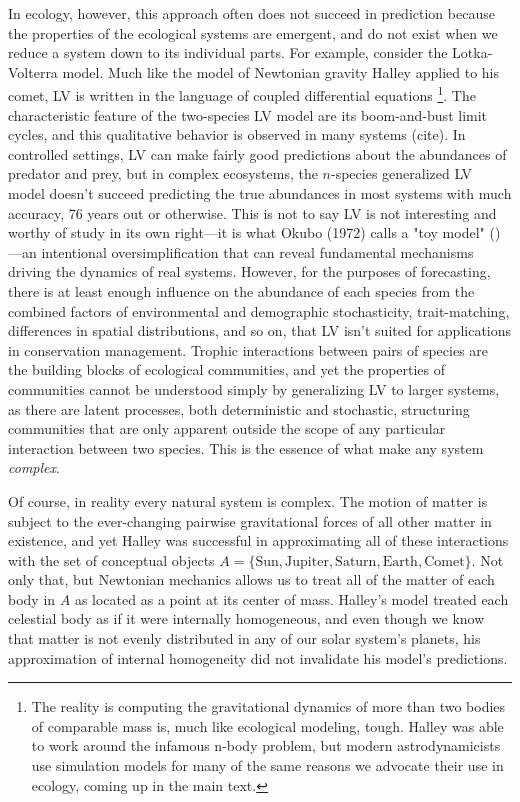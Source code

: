 \documentclass[]{article}
\begin{document}
In ecology, however, this approach often does not succeed in prediction because the properties of the ecological systems are emergent, and do
not exist when we reduce a system down to its individual parts.
For example, consider the Lotka-Volterra model.
Much like the model of Newtonian gravity Halley applied to his comet, LV is written in the
language of coupled differential equations
\footnote{The reality is computing the gravitational dynamics of more than two bodies of comparable mass is, much like ecological modeling, tough. Halley was able to work around the infamous n-body problem, but modern astrodynamicists use simulation models for many of the same reasons we advocate their use in ecology, coming up in the main text.}.\renewcommand*{\arraystretch}{1.4}
The characteristic feature of the two-species LV model are its boom-and-bust limit cycles, and this qualitative behavior is observed in many systems (cite).
In controlled settings, LV can make fairly good predictions about the abundances of predator and prey, but in complex ecosystems, the \(n\)-species generalized LV model doesn't succeed predicting the true abundances in most systems with much accuracy, 76 years out or otherwise.
This is not to say LV is not interesting and worthy of study in its own right---it is what Okubo (1972) calls a "toy model" (\cite{okubo_diffusion_2001})---an intentional oversimplification that can reveal fundamental mechanisms driving the dynamics of real systems.
However, for the purposes of forecasting, there is at least enough influence on the abundance of each species from the combined factors of environmental and demographic stochasticity, trait-matching, differences in spatial distributions, and so on, that LV isn't suited for applications in conservation management.
Trophic interactions between pairs of species are the building blocks of ecological communities, and yet the properties of communities cannot be understood simply by generalizing LV to larger systems, as there are latent processes, both deterministic and stochastic, structuring communities that are only apparent outside the scope of any particular interaction between two species. This is the essence of what make any system \emph{complex}.

Of course, in reality every natural system is complex.
The motion of matter is subject to the ever-changing pairwise gravitational forces of all other matter in existence, and yet Halley was successful in approximating all of these interactions with the set of conceptual objects \(A = \{\text{Sun}, \text{Jupiter}, \text{Saturn}, \text{Earth}, \text{Comet} \}\).
Not only that, but Newtonian mechanics allows us to treat all of the
matter of each body in \(A\) as located as a point at its center of mass.
Halley's model treated each celestial body as if it were internally homogeneous, and even though we know that matter is not evenly distributed in any of our solar system's planets, his approximation of internal homogeneity did not invalidate his model's predictions.
\end{document}
